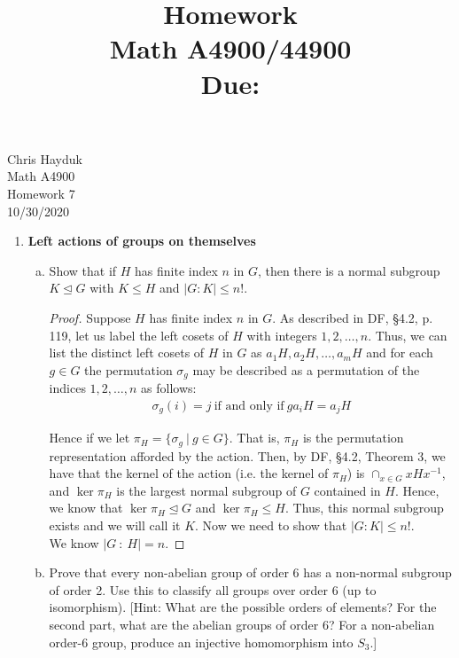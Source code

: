 \documentclass[11pt, reqno]{amsart}
\title[Homework \HW]{Homework \HW \\
Math A4900/44900\\
\small Due: \DUE}
\author{}
\theoremstyle{plain}
\theoremstyle{definition}
\theoremstyle{example}
\def\normeq{\unlhd}
\def\HW{7}
\def\DUE{10/30/2020}
\begin{document}
\begin{flushright}
Chris Hayduk\\
Math A4900\\
Homework \HW\\
\DUE
\end{flushright}





\begin{enumerate}[1.]
\item {\bf Left actions of groups on themselves}
\begin{enumerate}[(a)]
\item Show that if $H$ has finite index $n$ in $G$, then there is a normal subgroup $K \normeq G$ with $K \leq H$ and $|G:K| \leq n!$. 
\begin{proof}
Suppose $H$ has finite index $n$ in $G$. As described in DF, \S 4.2, p. 119, let us label the left cosets of $H$ with integers $1, 2, \ldots, n$. Thus, we can list the distinct left cosets of $H$ in $G$ as $a_1H, a_2H, \ldots, a_mH$ and for each $g \in G$ the permutation $\sigma_g$ may be described as a permutation of the indices $1, 2, \ldots, n$ as follows:
\begin{align*}
\sigma_g(i) = j \ \text{if and only if} \ ga_iH = a_jH
\end{align*}

Hence if we let $\pi_H = \{\sigma_g \ | \ g \in G\}$. That is, $\pi_H$ is the permutation representation afforded by the action. Then, by DF, \S 4.2, Theorem 3, we have that the kernel of the action (i.e. the kernel of $\pi_H$) is $\cap_{x \in G} xHx^{-1}$, and $\ker \pi_H$ is the largest normal subgroup of $G$ contained in $H$. Hence, we know that $\ker \pi_H \normeq G$ and $\ker \pi_H \leq H$. Thus, this normal subgroup exists and we will call it $K$. Now we need to show that $|G:K| \leq n!$.\\

We know $|G \ : \ H| = n$.
\end{proof}

\item Prove that every non-abelian group of order 6 has a non-normal subgroup of order 2. Use this to classify all groups over order 6 (up to isomorphism). {[Hint: What are the possible orders of elements? For the second part, what are the abelian groups of order 6? For a non-abelian order-6 group, produce an injective homomorphism into $S_3$.]}


\end{enumerate}
\end{enumerate}
\end{document}
